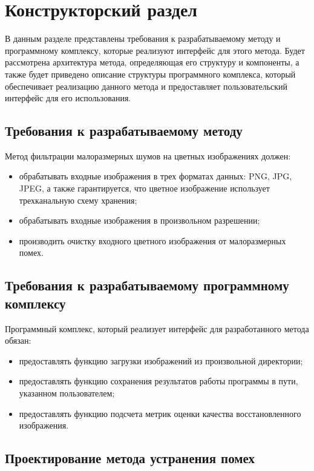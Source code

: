 \chapter{Конструкторский раздел}

В данным разделе представлены требования к разрабатываемому методу и программному комплексу, которые реализуют интерфейс для этого метода. Будет рассмотрена архитектура метода, определяющая его структуру и компоненты, а также будет приведено описание структуры программного комплекса, который обеспечивает реализацию данного метода и предоставляет пользовательский интерфейс для его использования.

\section{Требования к разрабатываемому методу}

Метод фильтрации малоразмерных шумов на цветных изображениях должен:
\begin{itemize}
    \item обрабатывать входные изображения в трех форматах данных: PNG, JPG, JPEG, а также гарантируется, что цветное изображение использует трехканальную схему хранения;
    \item обрабатывать входные изображения в произвольном разрешении;
    \item производить очистку входного цветного изображения от малоразмерных помех.
\end{itemize}

\section{Требования к разрабатываемому программному комплексу}
Программный комплекс, который реализует интерфейс для разработанного метода обязан:
\begin{itemize}
    \item предоставлять функцию загрузки изображений из произвольной директории;
    \item предоставлять функцию сохранения результатов работы программы в пути, указанном пользователем;
    \item предоставлять функцию подсчета метрик оценки качества восстановленного изображения.
\end{itemize}

\section{Проектирование метода устранения помех}

